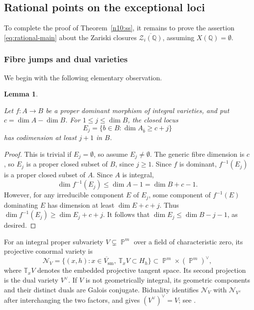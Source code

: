 \documentclass[a4paper,11pt, twoside,reqno]{amsart}
\theoremstyle{plain}
\newtheorem{lemma}[thm]{Lemma}
\theoremstyle{definition}
\theoremstyle{remark}
\newcommand{\QQ}{\mathbb{Q}}
\DeclareMathOperator{\PP}{\mathbb{P}}
\renewcommand{\bar}{\overline}
\renewcommand{\le}{\leqslant}
\renewcommand{\ge}{\geqslant}
\renewcommand{\geq}{\geqslant}
\numberwithin{equation}{section}
\begin{document}
\subsection{Rational points on the exceptional loci}
To complete the proof of Theorem~\ref{n10:ss}, it remains to prove the
assertion \eqref{eq:rational-main}
about the Zariski closures $\bar{\mathcal Z_i(\QQ)}$,
assuming $X(\QQ)=\emptyset$.

\subsubsection{Fibre jumps and dual varieties}
We begin with the following elementary observation. 
\begin{lemma}\label{app:ss:lem:fibre-jump} 

Let $f:A\to B$ be a proper dominant morphism of integral varieties, and
put $c=\dim A-\dim B$. For $1\le j\le \dim B$, the closed locus
\[
 E_j=\{b\in B:\dim A_{\bar b}\geq c+j\}
\]
has codimension at least $j+1$ in $B$.
\end{lemma}
\begin{proof}
This is trivial if $E_j=\emptyset$, so assume $E_j\ne \emptyset$.
The generic fibre dimension is $c$, so $E_j$ is a proper closed subset of $B$,
since $j\ge 1$.
Since $f$ is dominant, $f^{-1}(E_j)$ is a proper closed subset of $A$.
Since $A$ is integral,
$$\dim f^{-1}(E_j) \le \dim A - 1 = \dim B + c-1.$$
However, for any irreducible component $E$ of $E_j$, some component of
$f^{-1}(E)$ dominating $E$ has dimension at least $\dim E+c+j$.
Thus $\dim f^{-1}(E_j) \ge \dim E_j+c+j$.
It follows that $\dim E_j \le \dim B - j-1$, as desired.
\end{proof}

For an integral proper subvariety $V\subsetneq\PP^m$ over a field of characteristic
zero, its projective conormal variety is
\[
 \mathcal N_V=\bar{\{(x,h):x\in V_{\mathrm{sm}},\
                       \mathbb T_xV\subset H_h\}}
             \subset\PP^m\times(\PP^m)^\vee,
\]
where $\mathbb T_xV$ denotes the embedded projective tangent space.
Its second projection is the dual variety $V^\vee$.
If $V$ is not geometrically integral, its geometric components and
their distinct duals are Galois conjugate.
Biduality identifies $\mathcal N_V$ with $\mathcal N_{V^\vee}$ after
interchanging the two factors, and gives $(V^\vee)^\vee=V$;
see \cite[Theorem~1.7]{Tevelev}.
\end{document}
